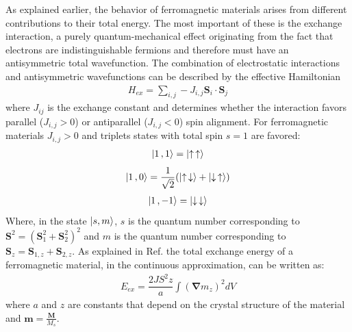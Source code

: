 \documentclass[12pt,a4paper,oneside,openany]{book}
\begin{document}
As explained earlier, the behavior of ferromagnetic materials arises from different contributions to their total energy. The most important of these is the exchange interaction, a purely quantum-mechanical effect originating from the fact that electrons are indistinguishable fermions and therefore must have an antisymmetric total wavefunction. The combination of electrostatic interactions and antisymmetric wavefunctions can be described by the effective Hamiltonian
\begin{align}
	H_{ex} = \sum_{i,j} -J_{i,j} \mathbf{S}_i \cdot \mathbf{S}_j
\end{align}
where $J_{ij}$ is the exchange constant and determines whether the interaction favors parallel ($J_{i,j}>0$) or antiparallel ($J_{i,j}<0$) spin alignment. For ferromagnetic materials $J_{i,j}>0$ and triplets states with total spin $s=1$ are favored:
\begin{align*}
	\ket{1 \, , 1} = \ket{\uparrow \, \uparrow}
\end{align*}
\begin{align*}
	\ket{1 \, , 0} = \dfrac{1}{\sqrt{2}} (\ket{\uparrow \, \downarrow} + \ket{\downarrow \, \uparrow})
\end{align*}
\begin{align*}
	\ket{1 \, , -1} = \ket{\downarrow \, \downarrow}
\end{align*}
Where, in the state $\ket{s, m}$, $s$ is the quantum number corresponding to $\mathbf{S}^2 = (\mathbf{S}_1^2 + \mathbf{S}_2^2)^2$ and $m$ is the quantum number corresponding to $\mathbf{S}_z = \mathbf{S}_{1, z} + \mathbf{S}_{2, z}$.  
As explained in Ref. \cite{Blundell} the total exchange energy of a ferromagnetic material, in the continuous approximation, can be written as:
\begin{align}
	E_{ex} = \dfrac{2JS^2z}{a} \int (\mathbf{\nabla} m_z)^2 dV
\end{align}
where $a$ and $z$ are constants that depend on the crystal structure of the material and $\mathbf{m} = \frac{\mathbf{M}}{M_s}$. 
\end{document}
